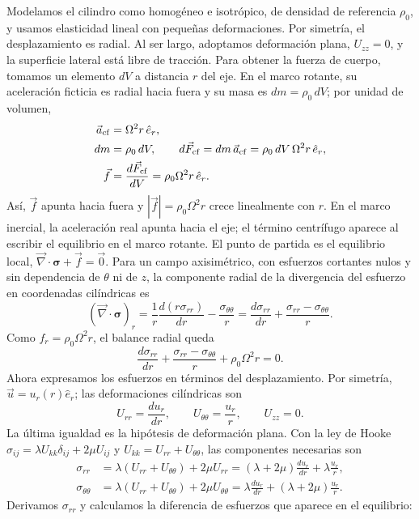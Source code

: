 \documentclass[a4paper]{article}
\begin{document}
Modelamos el cilindro como homogéneo e isotrópico, de densidad de referencia $\rho_0$, y usamos elasticidad lineal con pequeñas deformaciones. Por simetría, el desplazamiento es radial. Al ser largo, adoptamos deformación plana, $U_{zz}=0$, y la superficie lateral está libre de tracción. Para obtener la fuerza de cuerpo, tomamos un elemento $dV$ a distancia $r$ del eje. En el marco rotante, su aceleración ficticia es radial hacia fuera y su masa es $dm=\rho_0\,dV$; por unidad de volumen,
\[
\begin{aligned}
\vec a_{\rm cf}&=\Omega^2r\,\hat e_r,\\
dm&=\rho_0\,dV,\qquad d\vec F_{\rm cf}=dm\,\vec a_{\rm cf}
=\rho_0\,dV\,\Omega^2r\,\hat e_r,\\
\vec f&=\frac{d\vec F_{\rm cf}}{dV}
=\rho_0\Omega^2r\,\hat e_r.
\end{aligned}
\]
Así, $\vec f$ apunta hacia fuera y $|\vec f|=\rho_0\Omega^2r$ crece linealmente con $r$. En el marco inercial, la aceleración real apunta hacia el eje; el término centrífugo aparece al escribir el equilibrio en el marco rotante.
El punto de partida es el equilibrio local, $\vec\nabla\cdot\boldsymbol{\sigma}+\vec f=\vec 0$. Para un campo axisimétrico, con esfuerzos cortantes nulos y sin dependencia de $\theta$ ni de $z$, la componente radial de la divergencia del esfuerzo en coordenadas cilíndricas es
\[
(\vec\nabla\cdot\boldsymbol{\sigma})_r
=\frac{1}{r}\frac{d(r\sigma_{rr})}{dr}
-\frac{\sigma_{\theta\theta}}{r}
=\frac{d\sigma_{rr}}{dr}
+\frac{\sigma_{rr}-\sigma_{\theta\theta}}{r}.
\]
Como $f_r=\rho_0\Omega^2r$, el balance radial queda
\[
\frac{d\sigma_{rr}}{dr}
+\frac{\sigma_{rr}-\sigma_{\theta\theta}}{r}
+\rho_0\Omega^2r=0.
\]
Ahora expresamos los esfuerzos en términos del desplazamiento. Por simetría, $\vec u=u_r(r)\hat e_r$; las deformaciones cilíndricas son
\[
U_{rr}=\frac{du_r}{dr},
\qquad
U_{\theta\theta}=\frac{u_r}{r},
\qquad
U_{zz}=0.
\]
La última igualdad es la hipótesis de deformación plana. Con la ley de Hooke $\sigma_{ij}=\lambda U_{kk}\delta_{ij}+2\mu U_{ij}$ y $U_{kk}=U_{rr}+U_{\theta\theta}$, las componentes necesarias son
\[
\begin{aligned}
\sigma_{rr}
&=\lambda(U_{rr}+U_{\theta\theta})+2\mu U_{rr}
=(\lambda+2\mu)\frac{du_r}{dr}+\lambda\frac{u_r}{r},\\
\sigma_{\theta\theta}
&=\lambda(U_{rr}+U_{\theta\theta})+2\mu U_{\theta\theta}
=\lambda\frac{du_r}{dr}+(\lambda+2\mu)\frac{u_r}{r}.
\end{aligned}
\]
Derivamos $\sigma_{rr}$ y calculamos la diferencia de esfuerzos que aparece en el equilibrio:
\end{document}
